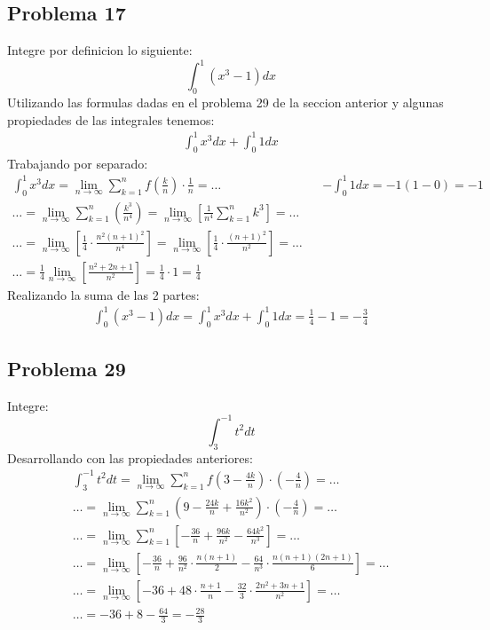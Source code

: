 \documentclass{article}
\begin{document}
\subsection{Problema 17}
Integre por definicion lo siguiente:
$$\int_{0}^{1}(x^3 -1)dx$$
Utilizando las formulas dadas en el problema 29 de la seccion anterior y algunas propiedades de las integrales tenemos:
\begin{align*}
  \int_{0}^{1} x^3dx + \int_{0}^{1} 1dx
\end{align*}
Trabajando por separado:
\begin{align*}
  \int_{0}^{1} x^3dx =\lim_{n\to\infty} \sum_{k=1}^{n}f\left(\frac{k}{n}\right)\cdot\frac{1}{n} = \dots &  & -\int_{0}^{1}1dx = -1(1-0) = -1  \\
  \dots = \lim_{n\to\infty} \sum_{k=1}^{n} \left(\frac{k^3}{n^4}\right) = \lim_{n\to\infty} \left[\frac{1}{n^4}\sum_{k=1}^{n}k^3\right]=\dots \\ \dots = \lim_{n\to\infty}\left[\frac{1}{4}\cdot\frac{n^2(n+1)^2}{n^4}\right] = \lim_{n\to\infty}\left[\frac{1}{4}\cdot\frac{(n+1)^2}{n^2}\right]= \dots \\ \dots = \frac{1}{4} \lim_{n\to\infty}\left[\frac{n^2+2n+1}{n^2}\right] = \frac{1}{4} \cdot 1 = \frac{1}{4}
\end{align*}
Realizando la suma de las 2 partes:
\begin{align*}
  \int_{0}^{1}(x^3 -1)dx = \int_{0}^{1} x^3dx + \int_{0}^{1} 1dx  = \frac{1}{4} -1 = -\frac{3}{4}
\end{align*}
\subsection{Problema 29}
Integre:
$$\int_{3}^{-1}t^2dt$$
Desarrollando con las propiedades anteriores:
\begin{align*}
  \int_{3}^{-1} t^2 dt = \lim_{n\to\infty}\sum_{k=1}^{n}f\left(3-\frac{4k}{n}\right)\cdot\left(-\frac{4}{n}\right) =\dots \\\dots = \lim_{n\to\infty}\sum_{k=1}^{n}\left(9-\frac{24k}{n}+\frac{16k^2}{n^2}\right)\cdot\left(-\frac{4}{n}\right) = \dots \\ \dots = \lim_{n\to\infty}\sum_{k=1}^{n}\left[-\frac{36}{n}+\frac{96k}{n^2}-\frac{64k^2}{n^3}\right] = \dots \\ \dots = \lim_{n\to\infty}\left[-\frac{36}{n}+\frac{96}{n^2}\cdot\frac{n(n+1)}{2}-\frac{64}{n^3}\cdot\frac{n(n+1)(2n+1)}{6}\right]=\dots \\ \dots = \lim_{n\to\infty}\left[-36+48\cdot\frac{n+1}{n}-\frac{32}{3}\cdot\frac{2n^2+3n+1}{n^2}\right]=\dots \\ \dots = -36+8-\frac{64}{3} = - \frac{28}{3}
\end{align*}
\end{document}
